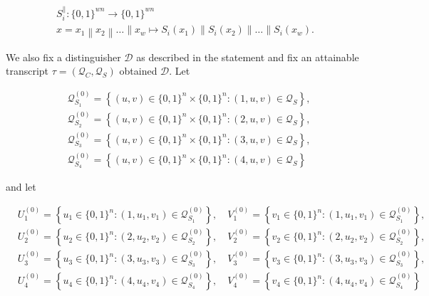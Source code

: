 $$
\begin{array}{c}
{S_{i}^{\|}:\{0,1\}^{w n} \rightarrow\{0,1\}^{w n}} \\
{x=x_{1}\left\|x_{2}\right\| \ldots\left\|x_{w} \longmapsto S_{i}\left(x_{1}\right)\right\| S_{i}\left(x_{2}\right)\|\ldots\| S_{i}\left(x_{w}\right)}.
\end{array}
$$

We also fix a distinguisher $\mathcal{D}$ as described in the statement and fix an attainable transcript $\tau =\left(\mathcal{Q}_{C}, \mathcal{Q}_{S}\right)$ obtained $\mathcal{D}$. Let

$$
\begin{aligned}
&\mathcal{Q}_{S_{1}}^{(0)}=\left\{(u, v) \in\{0,1\}^{n} \times\{0,1\}^{n}:(1, u, v) \in \mathcal{Q}_{S} \right\},\\
&\mathcal{Q}_{S_{2}}^{(0)}=\left\{(u, v) \in\{0,1\}^{n} \times\{0,1\}^{n}:(2, u, v) \in \mathcal{Q}_{S} \right\},\\
&\mathcal{Q}_{S_{3}}^{(0)}=\left\{(u, v) \in\{0,1\}^{n} \times\{0,1\}^{n}:(3, u, v) \in \mathcal{Q}_{S} \right\},\\
&\mathcal{Q}_{S_{4}}^{(0)}=\left\{(u, v) \in\{0,1\}^{n} \times\{0,1\}^{n}:(4, u, v) \in \mathcal{Q}_{S} \right\}
\end{aligned}
$$

\noindent and let

$$
\begin{aligned}
&U_{1}^{(0)}=\left\{u_{1} \in\{0,1\}^{n}:\left(1, u_{1}, v_{1}\right) \in \mathcal{Q}_{S_{1}}^{(0)}\right\}, \quad V_{1}^{(0)}=\left\{v_{1} \in\{0,1\}^{n}:\left(1, u_{1}, v_{1}\right) \in \mathcal{Q}_{S_{1}}^{(0)}\right\},\\
&U_{2}^{(0)}=\left\{u_{2} \in\{0,1\}^{n}:\left(2, u_{2}, v_{2}\right) \in \mathcal{Q}_{S_{2}}^{(0)}\right\}, \quad V_{2}^{(0)}=\left\{v_{2} \in\{0,1\}^{n}:\left(2, u_{2}, v_{2}\right) \in \mathcal{Q}_{S_{2}}^{(0)}\right\},\\
&U_{3}^{(0)}=\left\{u_{3} \in\{0,1\}^{n}:\left(3, u_{3}, v_{3}\right) \in \mathcal{Q}_{S_{3}}^{(0)}\right\}, \quad V_{3}^{(0)}=\left\{v_{3} \in\{0,1\}^{n}:\left(3, u_{3}, v_{3}\right) \in \mathcal{Q}_{S_{3}}^{(0)}\right\},\\
&U_{4}^{(0)}=\left\{u_{4} \in\{0,1\}^{n}:\left(4, u_{4}, v_{4}\right) \in \mathcal{Q}_{S_{4}}^{(0)}\right\}, \quad V_{4}^{(0)}=\left\{v_{4} \in\{0,1\}^{n}:\left(4, u_{4}, v_{4}\right) \in \mathcal{Q}_{S_{4}}^{(0)}\right\}
\end{aligned}
$$

